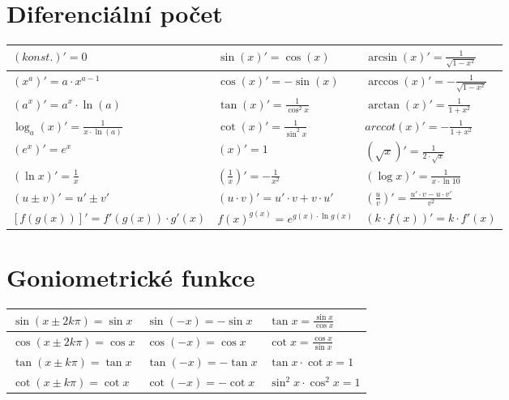 \documentclass{article}
\begin{document}
	\section*{Diferenciální počet}
	\begin{tabular}{|p{4cm}|p{4cm}|p{4cm}|}\hline
		$(konst.)' = 0$								&	$\sin(x)' = \cos(x)$							&	$\arcsin(x)' = \frac{1}{\sqrt{1-x^2}}$\\\hline
		$(x^{a})' = a \cdot x^{a-1}$				&	$\cos(x)' = -\sin(x)$							&	$\arccos(x)' = -\frac{1}{\sqrt{1-x^2}}$\\\hline
		$(a^{x})' = a^{x} \cdot \ln(a)$				&	$\tan(x)' = \frac{1}{\cos^2{x}}$				&	$\arctan(x)' = \frac{1}{1+x^2}$\\\hline
		$\log_{a}(x)' = \frac{1}{x \cdot \ln(a)}$	&	$\cot(x)' = \frac{1}{\sin^2{x}}$				&	$arccot(x)' = -\frac{1}{1+x^2}$\\\hline
		$(e^{x})' = e^{x}$							&	$(x)' = 1$										&	$\left(\sqrt{x}\right)' = \frac{1}{2 \cdot \sqrt{x}}$\\\hline
		$(\ln{x})' = \frac{1}{x}$					&	$\left(\frac{1}{x}\right)' = -\frac{1}{x^{2}}$	&	$(\log{x})' = \frac{1}{x \cdot \ln{10}}$\\\hline
		$(u \pm v)' = u' \pm v'$					&	$(u \cdot v)' = u' \cdot v + v \cdot u'$		&	$\left(\frac{u}{v}\right)' = \frac{u' \cdot v - u \cdot v'}{v^{2}}$\\\hline
		$[f(g(x))]' = f'(g(x)) \cdot g'(x)$			&	$f(x)^{g(x)} = e^{g(x) \cdot \ln{g(x)}}$		&	$(k \cdot f(x))' = k \cdot f'(x)$\\\hline
	\end{tabular}

	\section*{Goniometrické funkce}
	\begin{tabular}{|p{4cm}|p{4cm}|p{4cm}|}\hline
		$\sin{(x \pm 2k\pi)} = \sin{x}$				&	$\sin{(-x)} = -\sin{x}$							&	$\tan{x} = \frac{\sin{x}}{\cos{x}}$\\\hline
		$\cos{(x \pm 2k\pi)} = \cos{x}$				&	$\cos{(-x)} = \cos{x}$							&	$\cot{x} = \frac{\cos{x}}{\sin{x}}$\\\hline
		$\tan{(x \pm k\pi)} = \tan{x}$				&	$\tan{(-x)} = -\tan{x}$							&	$\tan{x} \cdot \cot{x} = 1$\\\hline
		$\cot{(x \pm k\pi)} = \cot{x}$				&	$\cot{(-x)} = -\cot{x}$							&	$\sin^{2}{x} \cdot \cos^{2}{x} = 1$\\\hline
	\end{tabular}
\end{document}
